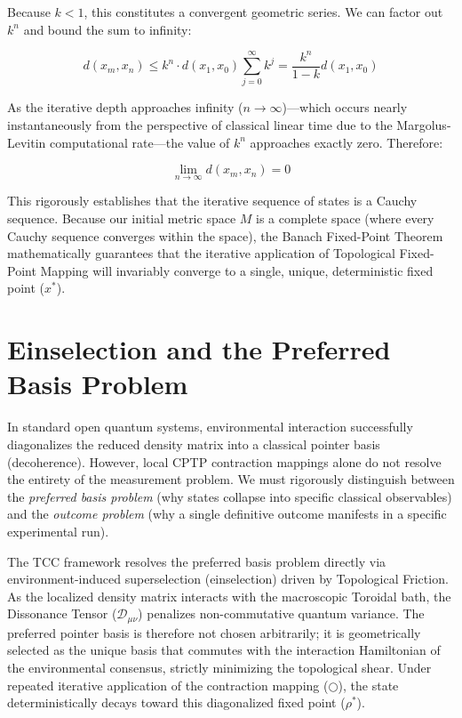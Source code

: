 \documentclass[12pt,openany]{book}
\theoremstyle{plain}
\theoremstyle{definition}
\theoremstyle{remark}
\begin{document}
Because $k < 1$, this constitutes a convergent geometric series. We can factor out $k^n$ and bound the sum to infinity:

\begin{equation}
d(x_m, x_n) \le k^n \cdot d(x_1, x_0) \sum_{j=0}^{\infty} k^j = \frac{k^n}{1 - k} d(x_1, x_0)
\end{equation}

As the iterative depth approaches infinity ($n \to \infty$)—which occurs nearly instantaneously from the perspective of classical linear time due to the Margolus-Levitin computational rate—the value of $k^n$ approaches exactly zero. Therefore:

\begin{equation}
\lim_{n \to \infty} d(x_m, x_n) = 0
\end{equation}

This rigorously establishes that the iterative sequence of states is a Cauchy sequence. Because our initial metric space $M$ is a complete space (where every Cauchy sequence converges within the space), the Banach Fixed-Point Theorem mathematically guarantees that the iterative application of Topological Fixed-Point Mapping will invariably converge to a single, unique, deterministic fixed point ($x^*$).

\section{Einselection and the Preferred Basis Problem}

In standard open quantum systems, environmental interaction successfully diagonalizes the reduced density matrix into a classical pointer basis (decoherence). However, local CPTP contraction mappings alone do not resolve the entirety of the measurement problem. We must rigorously distinguish between the \textit{preferred basis problem} (why states collapse into specific classical observables) and the \textit{outcome problem} (why a single definitive outcome manifests in a specific experimental run).

The TCC framework resolves the preferred basis problem directly via environment-induced superselection (einselection) driven by Topological Friction. As the localized density matrix interacts with the macroscopic Toroidal bath, the Dissonance Tensor ($\mathcal{D}_{\mu\nu}$) penalizes non-commutative quantum variance. The preferred pointer basis is therefore not chosen arbitrarily; it is geometrically selected as the unique basis that commutes with the interaction Hamiltonian of the environmental consensus, strictly minimizing the topological shear. Under repeated iterative application of the contraction mapping ($\bigcirc$), the state deterministically decays toward this diagonalized fixed point ($\rho^*$). 
\end{document}
